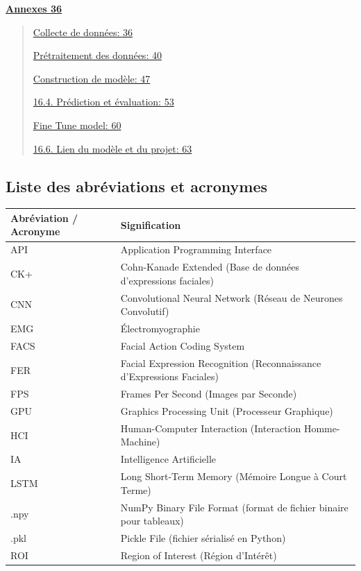 \documentclass[
]{article}
\begin{document}
\protect\hyperlink{annexes}{\textbf{Annexes 36}}

\begin{quote}
\protect\hyperlink{collecte-de-donnuxe9es}{Collecte de données: 36}

\protect\hyperlink{pruxe9traitement-des-donnuxe9es}{Prétraitement des données: 40}

\protect\hyperlink{construction-de-moduxe8le}{Construction de modèle: 47}

\protect\hyperlink{pruxe9diction-et-uxe9valuation}{16.4. Prédiction et évaluation: 53}

\protect\hyperlink{fine-tune-model}{Fine Tune model: 60}

\protect\hyperlink{lien-du-moduxe8le-et-du-projet}{16.6. Lien du modèle et du projet: 63}
\end{quote}

\hypertarget{liste-des-abruxe9viations-et-acronymes}{%
\subsection{Liste des abréviations et acronymes}\label{liste-des-abruxe9viations-et-acronymes}}

\begin{longtable}[]{@{}ll@{}}
\toprule
\textbf{Abréviation / Acronyme} & \textbf{Signification} \\
\midrule
\endhead
API & Application Programming Interface \\
CK+ & Cohn-Kanade Extended (Base de données d'expressions faciales) \\
CNN & Convolutional Neural Network (Réseau de Neurones Convolutif) \\
EMG & Électromyographie \\
FACS & Facial Action Coding System \\
FER & Facial Expression Recognition (Reconnaissance d'Expressions Faciales) \\
FPS & Frames Per Second (Images par Seconde) \\
GPU & Graphics Processing Unit (Processeur Graphique) \\
HCI & Human-Computer Interaction (Interaction Homme-Machine) \\
IA & Intelligence Artificielle \\
LSTM & Long Short-Term Memory (Mémoire Longue à Court Terme) \\
.npy & NumPy Binary File Format (format de fichier binaire pour tableaux) \\
.pkl & Pickle File (fichier sérialisé en Python) \\
ROI & Region of Interest (Région d'Intérêt) \\
\bottomrule
\end{longtable}
\end{document}

